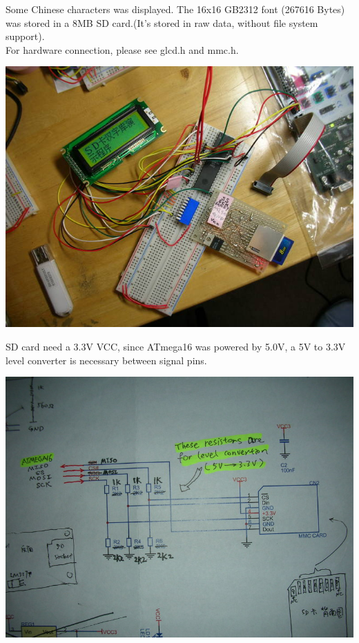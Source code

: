 \documentclass[11pt,a4paper]{article}
\begin{document}
Some Chinese characters was displayed. The 16x16 GB2312 font (267616 Bytes)
was stored in a 8MB SD card.(It's stored in raw data, without file system support).\\
For hardware connection, please see glcd.h and mmc.h.\\
\begin{center}
\includegraphics[scale=0.9]{glcd-sd-2.jpg}
\end{center}

SD card need a 3.3V VCC, since ATmega16 was powered by 5.0V, a 5V to 3.3V level
converter is necessary between signal pins.\\
\begin{center}
\includegraphics[scale=0.9]{sd.jpg}
\end{center}
\end{document}
